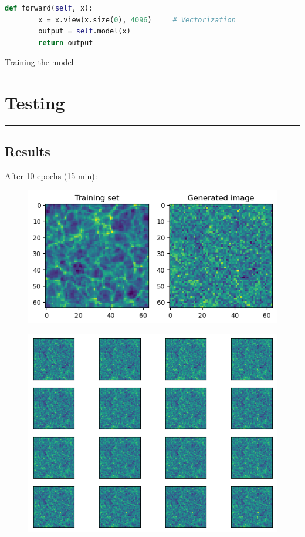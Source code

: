 \documentclass[11pt,a4paper]{report}
\begin{document}
\begin{multicols*}{2}
\begin{lstlisting}[language=Python, caption=Python example]
    def forward(self, x):
        x = x.view(x.size(0), 4096)     # Vectorization
        output = self.model(x)
        return output
    \end{lstlisting}

    Training the model
    

    \section{Testing}

    \begin{center} \rule{.5\linewidth}{1pt} \end{center}

    \subsection{Results}
    After 10 epochs (15 min):
    \begin{figure}[H]
        \centering
        \includegraphics[width = .9\linewidth]{./figure/10epochs_32batch.png}
    \end{figure}
    \begin{figure}[H]
        \centering
        \includegraphics[width = .9\linewidth]{./figure/10epochs_32batch_queblo.png}
    \end{figure}


\end{multicols*}
\end{document}
